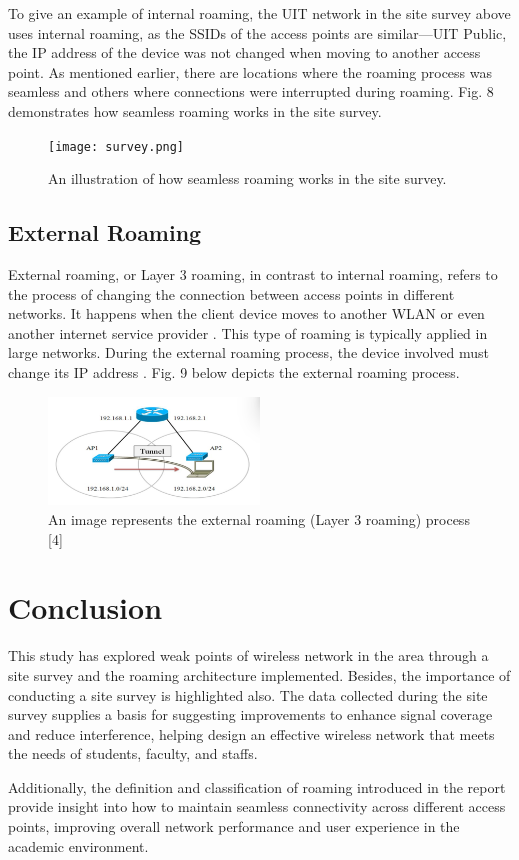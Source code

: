\documentclass[conference]{IEEEtran}
\begin{document}
To give an example of internal roaming, the UIT network in the site survey above uses internal roaming, as the SSIDs of the access points are similar—UIT Public, the IP address of the device was not changed when moving to another access point. As mentioned earlier, there are locations where the roaming process was seamless and others where connections were interrupted during roaming. Fig. 8 demonstrates how seamless roaming works in the site survey.

\begin{figure}[htbp]
    \centering
    \texttt{[image: survey.png]}
    \caption{An illustration of how seamless roaming works in the site survey.}
\end{figure}


\subsection{External Roaming}

External roaming, or Layer 3 roaming, in contrast to internal roaming, refers to the process of changing the connection between access points in different networks. It happens when the client device moves to another WLAN or even another internet service provider \cite{article_example}. This type of roaming is typically applied in large networks. During the external roaming process, the device involved must change its IP address \cite{article_example}. Fig. 9 below depicts the external roaming process.

\begin{figure}
    \centering
    \includegraphics[width=0.5\textwidth]{fig9.png}
    \caption{An image represents the external roaming (Layer 3 roaming) process [4]}
    \label{fig:enter-label}
\end{figure}

\section{Conclusion}
This study has explored weak points of wireless network in the area through a site survey and the roaming architecture implemented. Besides, the importance of conducting a site survey is highlighted also. The data collected during the site survey supplies a basis for suggesting improvements to enhance signal coverage and reduce interference, helping design an effective wireless network that meets the needs of students, faculty, and staffs.

Additionally, the definition and classification of roaming introduced in the report provide insight into how to maintain seamless connectivity across different access points, improving overall network performance and user experience in the academic environment.



\end{document}
